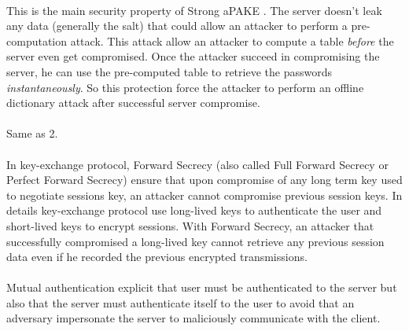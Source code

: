 \documentclass[../report.tex]{subfiles}
\begin{document}
\paragraph{}
This is the main security property of Strong aPAKE \cite{OPAQUE_Paper}. The server doesn't leak any data (generally the salt) that could allow an attacker to perform a pre-computation attack. This attack allow an attacker to compute a table \emph{before} the server even get compromised. Once the attacker succeed in compromising the server, he can use the pre-computed table to retrieve the passwords \emph{instantaneously}. So this protection force the attacker to perform an offline dictionary attack after successful server compromise. %

\paragraph{}
Same as 2.

\paragraph{}
In key-exchange protocol, Forward Secrecy (also called Full Forward Secrecy or Perfect Forward Secrecy) ensure that upon compromise of any long term key used to negotiate sessions key, an attacker cannot compromise previous session keys.
In details key-exchange protocol use long-lived keys to authenticate the user and short-lived keys to encrypt sessions. With Forward Secrecy, an attacker that successfully compromised a long-lived key cannot retrieve any previous session data even if he recorded the previous encrypted transmissions. %

\paragraph{}
Mutual authentication explicit that user must be authenticated to the server but also that the server must authenticate itself to the user to avoid that an adversary impersonate the server to maliciously communicate with the client.
\end{document}
